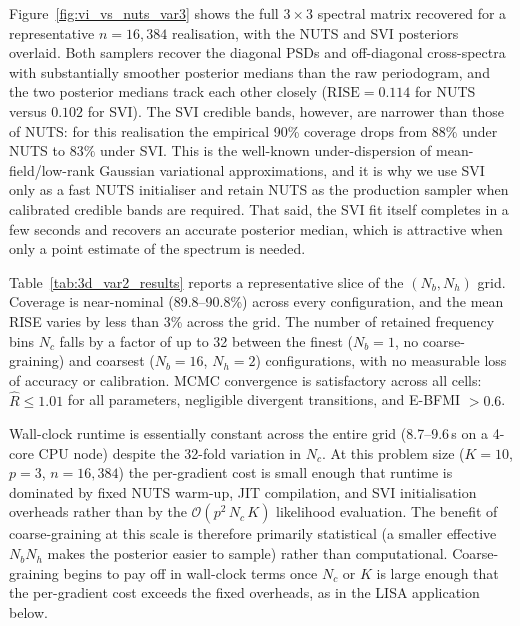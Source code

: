 \documentclass[%
	reprint,
	nofootinbib,
	amsmath,
	amssymb,
	aps,
]{revtex4-2}
\begin{document}
	Figure~\ref{fig:vi_vs_nuts_var3} shows the full $3\times 3$ spectral
	matrix recovered for a representative $n=16{,}384$ realisation, with
	the NUTS and SVI posteriors overlaid. Both samplers recover the
	diagonal PSDs and off-diagonal cross-spectra with substantially
	smoother posterior medians than the raw periodogram, and the two
	posterior medians track each other closely ($\mathrm{RISE}=0.114$
	for NUTS versus $0.102$ for SVI). The SVI credible bands, however,
	are narrower than those of NUTS: for this realisation the
	empirical 90\% coverage drops from $88\%$ under NUTS to $83\%$ under
	SVI. This is the well-known under-dispersion of mean-field/low-rank
	Gaussian variational approximations, and it is why we use SVI only
	as a fast NUTS initialiser and retain NUTS as the production sampler
	when calibrated credible bands are required. That said, the SVI fit
	itself completes in a few seconds and recovers an accurate posterior
	median, which is attractive when only a point estimate of the
	spectrum is needed.

	Table~\ref{tab:3d_var2_results} reports a representative slice of the
	$(N_{b},N_{h})$ grid. Coverage is near-nominal (89.8--90.8\%) across
	every configuration, and the mean RISE varies by less than 3\% across
	the grid. The number of retained frequency bins $N_{c}$ falls by a
	factor of up to 32 between the finest ($N_{b}=1$, no coarse-graining) and
	coarsest ($N_{b}=16$, $N_{h}=2$) configurations, with no measurable
	loss of accuracy or calibration. MCMC convergence is satisfactory
	across all cells: $\hat{R}\leq 1.01$ for all parameters, negligible
	divergent transitions, and E-BFMI $>0.6$.

	Wall-clock runtime is essentially constant across the entire grid
	(8.7--9.6\,s on a 4-core CPU node) despite the 32-fold variation in
	$N_{c}$. At this problem size ($K=10$, $p=3$, $n=16{,}384$) the
	per-gradient cost is small enough that runtime is dominated by fixed
	NUTS warm-up, JIT compilation, and SVI initialisation overheads
	rather than by the $\mathcal{O}(p^{2}\,N_{c}\,K)$ likelihood evaluation.
	The benefit of coarse-graining at this scale is therefore primarily
	statistical (a smaller effective $N_{b}N_{h}$ makes the posterior
	easier to sample) rather than computational. Coarse-graining begins
	to pay off in wall-clock terms once $N_{c}$ or $K$ is large enough
	that the per-gradient cost exceeds the fixed overheads, as in the
	LISA application below.
\end{document}
